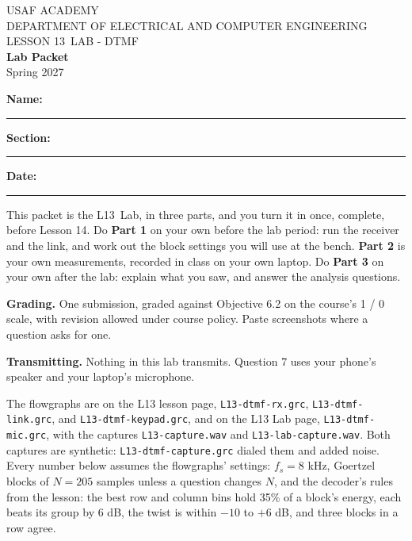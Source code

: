 \documentclass{exam}
\def\labLesson{13}
\def\thisterm{\thisTermIn}
\def\thisterm{Spring 2027}
\begin{document}
\pagestyle{headandfoot}   %


\begin{center}
USAF ACADEMY \\
DEPARTMENT OF ELECTRICAL AND COMPUTER ENGINEERING \\
LESSON \labLesson\ LAB - DTMF \\
\textbf{Lab Packet} \\
\thisterm \\[4mm]
\end{center}

\vspace{-4pt}
\textbf{Name:} \rule[-2pt]{2.6in}{0.4pt} \hfill
\textbf{Section:} \rule[-2pt]{0.9in}{0.4pt} \hfill
\textbf{Date:} \rule[-2pt]{1.1in}{0.4pt}

\vspace{4pt}


\vspace{2pt}

This packet is the L\labLesson\ Lab, in three parts, and you turn it in once, complete,
before Lesson 14. Do \textbf{Part 1} on your own before the lab period: run the receiver
and the link, and work out the block settings you will use at the bench. \textbf{Part 2} is your own
measurements, recorded in class on your own laptop. Do \textbf{Part 3} on your own after
the lab: explain what you saw, and answer the analysis questions.

\textbf{Grading.} One submission, graded against Objective 6.2 on the course's
1 / 0 scale, with revision allowed under course policy. Paste screenshots where a
question asks for one.

\textbf{Transmitting.} Nothing in this lab transmits. Question 7 uses your phone's
speaker and your laptop's microphone.

The flowgraphs are on the L13 lesson page, \texttt{L13-dtmf-rx.grc},
\texttt{L13-dtmf-link.grc}, and \texttt{L13-dtmf-keypad.grc}, and on the L13 Lab page,
\texttt{L13-dtmf-mic.grc}, with the captures \texttt{L13-capture.wav} and
\texttt{L13-lab-capture.wav}. Both captures are synthetic: \texttt{L13-dtmf-capture.grc}
dialed them and added noise. Every number below assumes the flowgraphs' settings:
$f_s = 8$ kHz, Goertzel blocks of $N = 205$ samples unless a question changes $N$, and the
decoder's rules from the lesson: the best row and column bins hold 35\% of a block's
energy, each beats its group by 6 dB, the twist is within $-10$ to $+6$ dB, and three
blocks in a row agree.
\end{document}
